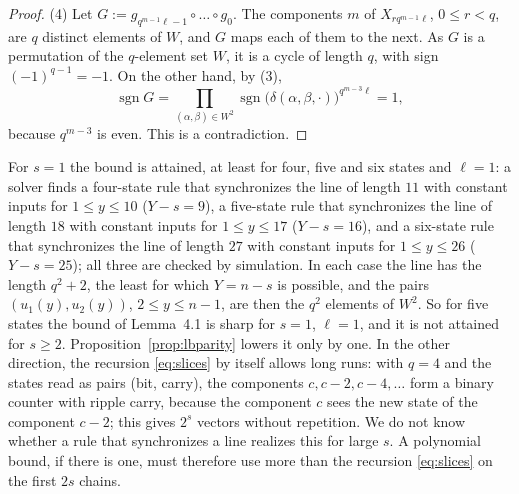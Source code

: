 \documentclass[11pt]{article}
\theoremstyle{remark}
\begin{document}
\begin{proof}
(4) Let $G:=g_{q^{m-1}\ell-1}\circ\dots\circ g_0$. The components $m$ of $X_{rq^{m-1}\ell}$, $0\le r<q$, are $q$
distinct elements of $W$, and $G$ maps each of them to the next. As $G$ is a permutation of the $q$-element
set $W$, it is a cycle of length $q$, with sign $(-1)^{q-1}=-1$. On the other hand, by (3),
\[
\operatorname{sgn}G=\prod_{(\alpha,\beta)\in W^2}\operatorname{sgn}\bigl(\delta(\alpha,\beta,\cdot)\bigr)^{q^{m-3}\ell}=1,
\]
because $q^{m-3}$ is even. This is a contradiction.
\end{proof}

For $s=1$ the bound is attained, at least for four, five and six states and $\ell=1$: a solver finds a
four-state rule that synchronizes the line of length $11$ with constant inputs for $1\le y\le10$ ($Y-s=9$), a
five-state rule that synchronizes the line of length $18$ with constant inputs for $1\le y\le17$ ($Y-s=16$),
and a six-state rule that synchronizes the line of length $27$ with constant inputs for $1\le y\le26$
($Y-s=25$); all three are checked by simulation. In each case the line has the length $q^2+2$, the least for
which $Y=n-s$ is possible, and the pairs $(u_1(y),u_2(y))$, $2\le y\le n-1$, are then the $q^2$ elements of
$W^2$. So for five states the bound of Lemma~4.1 is sharp for $s=1$, $\ell=1$, and it is not attained for $s\ge2$.
Proposition~\ref{prop:lbparity} lowers it only by one. In the other direction, the recursion
\eqref{eq:slices} by itself allows long runs: with $q=4$ and the states read as pairs (bit, carry), the
components $c,c-2,c-4,\dots$ form a binary counter with ripple carry, because the component $c$ sees the new
state of the component $c-2$; this gives $2^s$ vectors without repetition. We do not know whether a rule
that synchronizes a line realizes this for large $s$. A polynomial bound, if there is one, must therefore
use more than the recursion \eqref{eq:slices} on the first $2s$ chains.
\end{document}
